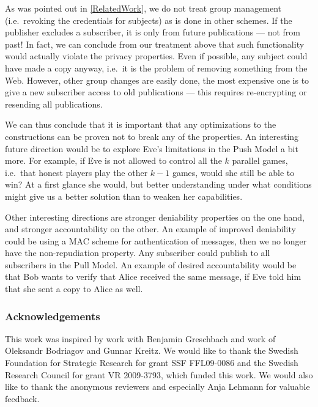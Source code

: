 As was pointed out in \cref{RelatedWork}, we do not treat group management 
(i.e.\ revoking the credentials for subjects) as is done in other schemes.
If the publisher excludes a subscriber, it is only from future publications ---
not from past!
In fact, we can conclude from our treatment above that such functionality would 
actually violate the privacy properties.
Even if possible, any subject could have made a copy anyway, i.e.\ it is the 
problem of removing something from the Web.
However, other group changes are easily done, the most expensive one is to give
a new subscriber access to old publications --- this requires re-encrypting or 
resending all publications.

We can thus conclude that it is important that any optimizations to the 
constructions can be proven not to break any of the properties.
An interesting future direction would be to explore Eve's limitations in the 
Push Model a bit more.
For example, if Eve is not allowed to control all the \(k\) parallel games, 
i.e.\ that honest players play the other \(k-1\) games, would she still be able
to win?
At a first glance she would, but better understanding under what conditions 
might give us a better solution than to weaken her capabilities.

Other interesting directions are stronger deniability properties on the one 
hand, and stronger accountability on the other.
An example of improved deniability could be using a \ac{MAC} scheme for 
authentication of messages, then we no longer have the non-repudiation 
property.
Any subscriber could publish to all subscribers in the Pull Model.
An example of desired accountability would be that Bob wants to verify that 
Alice received the same message, if Eve told him that she sent a copy to Alice 
as well.


\subsubsection{Acknowledgements}

This work was inspired by work with Benjamin Greschbach and work of Oleksandr 
Bodriagov and Gunnar Kreitz.
We would like to thank the Swedish Foundation for Strategic Research for grant 
SSF FFL09-0086 and the Swedish Research Council for grant VR 2009-3793, which 
funded this work.
We would also like to thank the anonymous reviewers and especially Anja Lehmann 
for valuable feedback.


\printbibliography{}


\appendix

